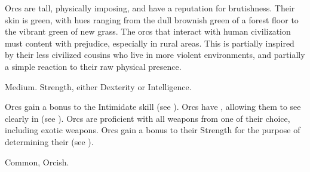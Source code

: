 
  Orcs are tall, physically imposing, and have a reputation for brutishness.
  Their skin is green, with hues ranging from the dull brownish green of a forest floor to the vibrant green of new grass.
  The orcs that interact with human civilization must content with prejudice, especially in rural areas.
  This is partially inspired by their less civilized cousins who live in more violent environments, and partially a simple reaction to their raw physical presence.

   Medium.
    Strength, either  Dexterity or  Intelligence.
  \begin{raggeditemize}
     Orcs gain a  bonus to the Intimidate skill (see ).
     Orcs have , allowing them to see clearly in  (see ).
     Orcs are proficient with all weapons from one  of their choice, including exotic weapons.
     Orcs gain a  bonus to their Strength for the purpose of determining their  (see ).
  \end{raggeditemize}
   Common, Orcish.
